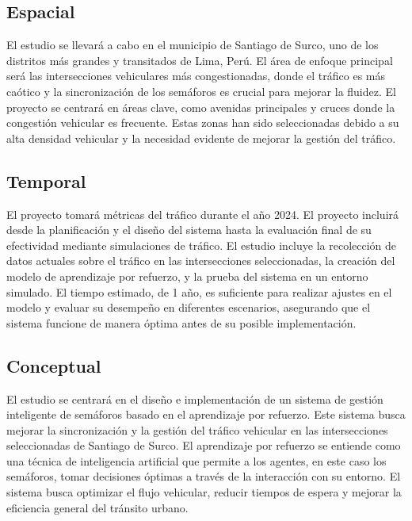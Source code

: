 \subsection{Espacial}
El estudio se llevará a cabo en el municipio de Santiago de Surco, uno de los distritos más grandes y transitados de Lima, Perú. El área de enfoque principal será las intersecciones vehiculares más congestionadas, donde el tráfico es más caótico y la sincronización de los semáforos es crucial para mejorar la fluidez. El proyecto se centrará en áreas clave, como avenidas principales y cruces donde la congestión vehicular es frecuente. Estas zonas han sido seleccionadas debido a su alta densidad vehicular y la necesidad evidente de mejorar la gestión del tráfico.

\subsection{Temporal}
El proyecto tomará métricas del tráfico durante el año 2024. El proyecto incluirá desde la planificación y el diseño del sistema hasta la evaluación final de su efectividad mediante simulaciones de tráfico. El estudio incluye la recolección de datos actuales sobre el tráfico en las intersecciones seleccionadas, la creación del modelo de aprendizaje por refuerzo, y la prueba del sistema en un entorno simulado. El tiempo estimado, de 1 año, es suficiente para realizar ajustes en el modelo y evaluar su desempeño en diferentes escenarios, asegurando que el sistema funcione de manera óptima antes de su posible implementación.

\subsection{Conceptual}
El estudio se centrará en el diseño e implementación de un sistema de gestión inteligente de semáforos basado en el aprendizaje por refuerzo. Este sistema busca mejorar la sincronización y la gestión del tráfico vehicular en las intersecciones seleccionadas de Santiago de Surco. El aprendizaje por refuerzo se entiende como una técnica de inteligencia artificial que permite a los agentes, en este caso los semáforos, tomar decisiones óptimas a través de la interacción con su entorno. El sistema busca optimizar el flujo vehicular, reducir tiempos de espera y mejorar la eficiencia general del tránsito urbano.

